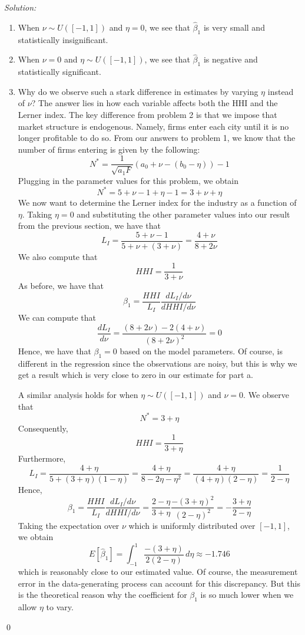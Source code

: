 \documentclass[12pt]{article}
\newenvironment{sol}
    {\emph{Solution:}
    }
    {
    \qed
    }
\begin{document}
\begin{sol}
\begin{table}[!ht]
         \label{tab:reg_table_b} %
         \end{table}
   \begin{enumerate}[label=\alph*) ]
      \item When $\nu \sim U([-1, 1])$ and $\eta = 0$, we see that $\hat{\beta}_1$ is very small and statistically insignificant.
      \item When $\nu = 0$ and $\eta \sim U([-1,1])$, we see that $\hat{\beta}_1$ is negative and statistically significant.
      \item Why do we observe such a stark difference in estimates by varying $\eta$ instead of $\nu$? The answer lies in how each variable affects both the HHI and the Lerner index. The key difference from problem 2 is that we impose that market structure is endogenous. Namely, firms enter each city until it is no longer profitable to do so. From our answers to problem 1, we know that the number of firms entering is given by the following:
      \[N^* = \frac{1}{\sqrt{a_1 F}}(a_0 + \nu - (b_0 - \eta)) - 1\]
      Plugging in the parameter values for this problem, we obtain
      \[N^* = 5 + \nu - 1 + \eta - 1 = 3 + \nu + \eta\]
      We now want to determine the Lerner index for the industry as a function of $\eta$. Taking $\eta = 0$ and substituting the other parameter values into our result from the previous section, we have that 
      \[L_I = \frac{5 + \nu -1 }{5 + \nu  + (3 + \nu)} = \frac{4 + \nu}{8 +2\nu}\]
      We also compute that
      \[HHI = \frac{1}{3 + \nu}\]
      As before, we have that
      \[\beta_1 = \frac{HHI}{L_I} \frac{d L_I/ d\nu}{d HHI/d \nu}\]
      We can compute that 
      \[\frac{d L_I}{d \nu} = \frac{(8 + 2\nu) - 2(4 + \nu)}{(8 + 2\nu)^2} = 0\]
      Hence, we have that $\beta_1 = 0$ based on the model parameters. Of course, is different in the regression since the observations are noisy, but this is why we get a result which is very close to zero in our estimate for part a.
      
      A similar analysis holds for when $\eta \sim U([-1,1])$ and $\nu = 0$. We observe that
      \[N^* = 3 + \eta\]
      Consequently,
      \[HHI = \frac{1}{3 + \eta}\]
      Furthermore, 
      \[L_I = \frac{4 + \eta}{5 + (3+\eta)(1-\eta)} = \frac{4 + \eta}{8 - 2\eta - \eta^2} = \frac{4+\eta}{(4 + \eta)(2-\eta )} = \frac{1}{2-\eta}\]
      Hence,
      \[\beta_1 = \frac{HHI}{L_I} \frac{d L_I/ d\nu}{d HHI/d \nu} =  \frac{2 - \eta}{3 + \eta} \frac{-(3+\eta)^2}{(2-\eta)^2} = -\frac{3 + \eta}{2 - \eta}\]
      Taking the expectation over $\nu$ which is uniformly distributed over $[-1,1]$, we obtain
      \[E[\hat{\beta}_1 ] = \int_{-1}^1 \frac{-(3 + \eta)}{2(2 - \eta)} \, d\eta \approx -1.746\]
      which is reasonably close to our estimated value. Of course, the measurement error in the data-generating process can account for this discrepancy. But this is the theoretical reason why the coefficient for $\beta_1$ is so much lower when we allow $\eta$ to vary. 
   \end{enumerate}
\end{sol}

    
\end{document}
